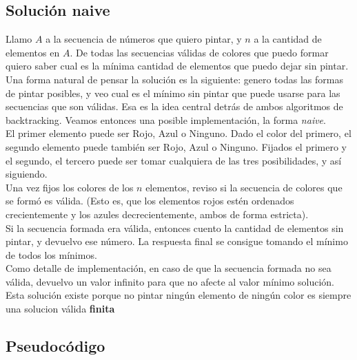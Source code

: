 \subsection{Solución naive}

Llamo $A$ a la secuencia de números que quiero pintar, y $n$ a la cantidad de elementos en $A$. De todas las secuencias válidas de colores que puedo formar quiero saber cual es la mínima cantidad de elementos que puedo dejar sin pintar. \\

Una forma natural de pensar la solución es la siguiente: genero todas las formas de pintar posibles, y veo cual es el mínimo sin pintar que puede usarse para las secuencias que son válidas. Esa es la idea central detrás de ambos algoritmos de backtracking. Veamos entonces una posible implementación, la forma \textit{naive}. \\

El primer elemento puede ser Rojo, Azul o Ninguno. Dado el color del primero, el segundo elemento puede también ser Rojo, Azul o Ninguno. Fijados el primero y el segundo, el tercero puede ser tomar cualquiera de las tres posibilidades, y así siguiendo. \\

Una vez fijos los colores de los $n$ elementos, reviso si la secuencia de colores que se formó es válida. (Esto es, que los elementos rojos estén ordenados crecientemente y los azules decrecientemente, ambos de forma estricta). \\

Si la secuencia formada era válida, entonces cuento la cantidad de elementos sin pintar, y devuelvo ese número. La respuesta final se consigue tomando el mínimo de todos los mínimos. \\

Como detalle de implementación, en caso de que la secuencia formada no sea válida, devuelvo un valor infinito para que no afecte al valor mínimo solución. Esta solución existe porque no pintar ningún elemento de ningún color es siempre una solucion válida \textbf{finita}


\subsection{Pseudocódigo}

